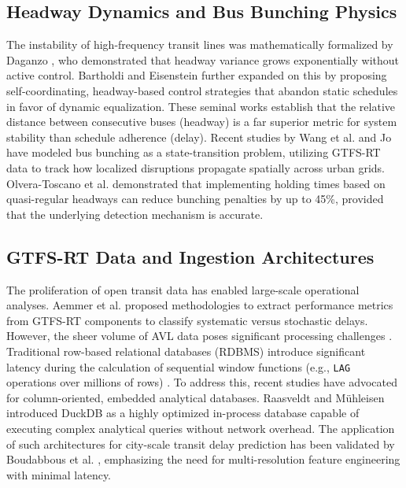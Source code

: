 \documentclass[journal,twocolumn]{IEEEtran}
\begin{document}
\subsection{Headway Dynamics and Bus Bunching Physics}
The instability of high-frequency transit lines was mathematically formalized by Daganzo \cite{1}, who demonstrated that headway variance grows exponentially without active control. Bartholdi and Eisenstein \cite{2} further expanded on this by proposing self-coordinating, headway-based control strategies that abandon static schedules in favor of dynamic equalization. These seminal works establish that the relative distance between consecutive buses (headway) is a far superior metric for system stability than schedule adherence (delay). Recent studies by Wang et al. \cite{3} and Jo \cite{4} have modeled bus bunching as a state-transition problem, utilizing GTFS-RT data to track how localized disruptions propagate spatially across urban grids. Olvera-Toscano et al. \cite{10} demonstrated that implementing holding times based on quasi-regular headways can reduce bunching penalties by up to 45\%, provided that the underlying detection mechanism is accurate.

\subsection{GTFS-RT Data and Ingestion Architectures}
The proliferation of open transit data has enabled large-scale operational analyses. Aemmer et al. \cite{11} proposed methodologies to extract performance metrics from GTFS-RT components to classify systematic versus stochastic delays. However, the sheer volume of AVL data poses significant processing challenges \cite{12}. Traditional row-based relational databases (RDBMS) introduce significant latency during the calculation of sequential window functions (e.g., \texttt{LAG} operations over millions of rows) \cite{13}. To address this, recent studies have advocated for column-oriented, embedded analytical databases. Raasveldt and Mühleisen \cite{14} introduced DuckDB as a highly optimized in-process database capable of executing complex analytical queries without network overhead. The application of such architectures for city-scale transit delay prediction has been validated by Boudabbous et al. \cite{15}, emphasizing the need for multi-resolution feature engineering with minimal latency.
\end{document}
